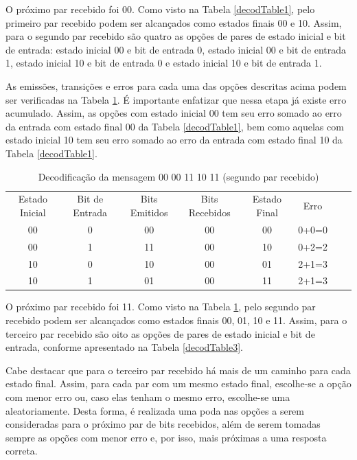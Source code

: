 \documentclass[12pt]{article}
\begin{document}
O próximo par recebido foi 00. Como visto na Tabela \ref{decodTable1}, pelo primeiro par recebido podem ser alcançados como estados finais 00 e 10. Assim, para o segundo par recebido são quatro as opções de pares de estado inicial e bit de entrada: estado inicial 00 e bit de entrada 0, estado inicial 00 e bit de entrada 1, estado inicial 10 e bit de entrada 0 e estado inicial 10 e bit de entrada 1. 

As emissões, transições e erros para cada uma das opções descritas acima podem ser verificadas na Tabela \ref{decodTable2}. É importante enfatizar que nessa etapa já existe erro acumulado. Assim, as opções com estado inicial 00 tem seu erro somado ao erro da entrada com estado final 00 da Tabela \ref{decodTable1}, bem como aquelas com estado inicial 10 tem seu erro somado ao erro da entrada com estado final 10 da Tabela \ref{decodTable1}.

\begin{table}[!ht]
\centering
\caption{Decodificação da mensagem 00 00 11 10 11 (segundo par recebido)}
\label{decodTable2}
\def\arraystretch{1.2}
\begin{tabular}{cccccccc}
\multirow{2}{4.2em}{Estado Inicial} & \multirow{2}{4.2em}{Bit de Entrada} &  \multirow{2}{4.2em}{Bits Emitidos} & \multirow{2}{4.2em}{Bits Recebidos} & \multirow{2}{4.2em}{Estado Final} & \multirow{2}{4.2em}{Erro} \\&&&&&\\ \hline
 00 & 0 & 00 & 00 & 00 & 0+0=0 &\\
 00 & 1 & 11 & 00 & 10 & 0+2=2 &\\
 10 & 0 & 10 & 00 & 01 & 2+1=3 &\\
 10 & 1 & 01 & 00 & 11 & 2+1=3 &\\\hline
\end{tabular}
\end{table}

O próximo par recebido foi 11. Como visto na Tabela \ref{decodTable2}, pelo segundo par recebido podem ser alcançados como estados finais 00, 01, 10 e 11. Assim, para o terceiro par recebido são oito as opções de pares de estado inicial e bit de entrada, conforme apresentado na Tabela \ref{decodTable3}.

Cabe destacar que para o terceiro par recebido há mais de um caminho para cada estado final. Assim, para cada par com um mesmo estado final, escolhe-se a opção com menor erro ou, caso elas tenham o mesmo erro, escolhe-se uma aleatoriamente. Desta forma, é realizada uma poda nas opções a serem consideradas para o próximo par de bits recebidos, além de serem tomadas sempre as opções com menor erro e, por isso, mais próximas a uma resposta correta.
\end{document}
